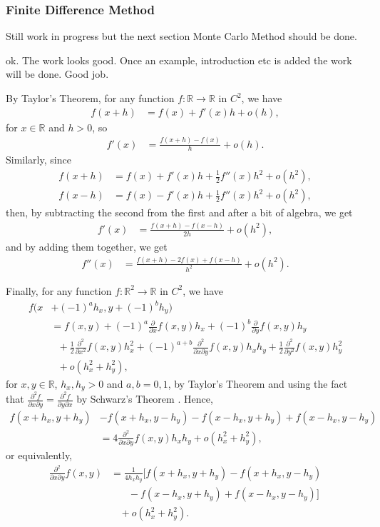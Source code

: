 \documentclass[english]{article}
\newcommand{\comment}[1]{\color{blue}#1\color{black}}
\newcommand{\tomcomment}[1]{\color{orange}#1\color{black}}
\numberwithin{equation}{section}
\numberwithin{figure}{section}
\theoremstyle{bolddescit}
\theoremstyle{definition}
\theoremstyle{definition}
\theoremstyle{plain}
\theoremstyle{plain}
\theoremstyle{bolddesc}
\theoremstyle{plain}
\theoremstyle{remark}
\begin{document}
\subsubsection{Finite Difference Method}

\tomcomment{Still work in progress but the next section Monte Carlo Method should be done.}

\comment{ok. The work looks good. Once an example, introduction etc is added the work will be done. Good job.}

By Taylor's Theorem, for any function $f : \mathbb{R} \to \mathbb{R}$ in $C^2$, we have
\begin{align*}
  f(x+h) &= f(x) + f'(x) h + o(h),
\end{align*}
for $x \in \mathbb{R}$ and $h > 0$, so
\begin{align*}
  f'(x) &= \frac{f(x+h) - f(x)}{h} + o(h).
\end{align*}
Similarly, since
\begin{align*}
  f(x+h) &= f(x) + f'(x) h + \frac{1}{2} f''(x) h^2 + o(h^2),\\
  f(x-h) &= f(x) - f'(x) h + \frac{1}{2} f''(x) h^2 + o(h^2),
\end{align*}
then, by subtracting the second from the first and after a bit of algebra, we get
\begin{align*}
  f'(x) &= \frac{f(x+h) - f(x-h)}{2h} + o(h^2),
\end{align*}
and by adding them together, we get
\begin{align*}
  f''(x) &= \frac{f(x+h) - 2f(x) + f(x-h)}{h^2} + o(h^2).
\end{align*}

Finally, for any function $f : \mathbb{R}^2 \to \mathbb{R}$ in $C^2$, we have
\begin{align*}
  f(x&+ (-1)^a h_x, y + (-1)^b h_y)\\
  &= f(x,y) + (-1)^a \frac{\partial}{\partial x} f(x,y) h_x + (-1)^b \frac{\partial}{\partial y} f(x,y) h_y\\
  &\ \ \ + \frac{1}{2} \frac{\partial^2}{\partial x^2} f(x,y) h_x^2 + (-1)^{a+b} \frac{\partial^2}{\partial x \partial y} f(x,y) h_x h_y + \frac{1}{2} \frac{\partial^2}{\partial y^2} f(x,y) h_y^2\\
  &\ \ \ + o(h_x^2 + h_y^2),
\end{align*}
for $x,y \in \mathbb{R}$, $h_x, h_y > 0$ and $a,b=0,1$, by Taylor's Theorem and using the fact that $\frac{\partial^2 f}{\partial x \partial y} = \frac{\partial^2 f}{\partial y \partial x}$ by Schwarz's Theorem . Hence,
\begin{align*}
  f(x+h_x,y+h_y) &- f(x+h_x,y-h_y) - f(x-h_x,y+h_y) + f(x-h_x,y-h_y)\\
  &= 4 \frac{\partial^2}{\partial x \partial y} f(x,y) h_x h_y + o(h_x^2 + h_y^2),
\end{align*}
or equivalently,
\begin{align*}
  \frac{\partial^2}{\partial x \partial y} f(x,y)
  &= \frac{1}{4 h_x h_y} [f(x+h_x,y+h_y) - f(x+h_x,y-h_y)\\
  &\ \ \ \ \ \ \ \ - f(x-h_x,y+h_y) + f(x-h_x,y-h_y)]\\
  &\ \ \ \ + o(h_x^2 + h_y^2).
\end{align*}
\end{document}
